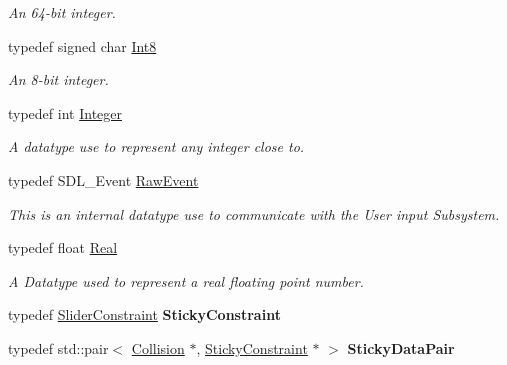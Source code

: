 \begin{DoxyCompactItemize}
\begin{DoxyCompactList}\small\item\em An 64-\/bit integer. \item\end{DoxyCompactList}\item 
typedef signed char \hyperlink{namespaceMezzanine_acbb048ee99aa07566d5a6eb33f5a2c2d}{Int8}
\begin{DoxyCompactList}\small\item\em An 8-\/bit integer. \item\end{DoxyCompactList}\item 
typedef int \hyperlink{namespaceMezzanine_ac3576e52af3c62d13dde94829e0c5465}{Integer}
\begin{DoxyCompactList}\small\item\em A datatype use to represent any integer close to. \item\end{DoxyCompactList}\item 
typedef SDL\_\-Event \hyperlink{namespaceMezzanine_ae8d4c0ab783af89a250b0225b75753e5}{RawEvent}
\begin{DoxyCompactList}\small\item\em This is an internal datatype use to communicate with the User input Subsystem. \item\end{DoxyCompactList}\item 
typedef float \hyperlink{namespaceMezzanine_a726731b1a7df72bf3583e4a97282c6f6}{Real}
\begin{DoxyCompactList}\small\item\em A Datatype used to represent a real floating point number. \item\end{DoxyCompactList}\item 
\hypertarget{namespaceMezzanine_a4a538e16995de98802eeb28ca209d721}{
typedef \hyperlink{classMezzanine_1_1SliderConstraint}{SliderConstraint} {\bfseries StickyConstraint}}
\label{namespaceMezzanine_a4a538e16995de98802eeb28ca209d721}

\item 
\hypertarget{namespaceMezzanine_ad4b7200ca0d9b0a31e5edf8f63ad1c8c}{
typedef std::pair$<$ \hyperlink{classMezzanine_1_1Collision}{Collision} $\ast$, \hyperlink{classMezzanine_1_1SliderConstraint}{StickyConstraint} $\ast$ $>$ {\bfseries StickyDataPair}}
\label{namespaceMezzanine_ad4b7200ca0d9b0a31e5edf8f63ad1c8c}


\end{DoxyCompactItemize}
